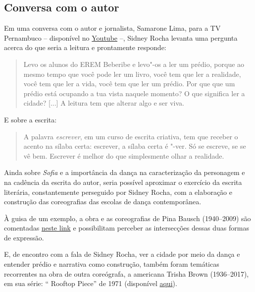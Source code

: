\documentclass[12pt]{extarticle}
\begin{document}
\subsection{Conversa com o autor}

Em uma conversa com o autor e jornalista, Samarone Lima, para a TV Pernambuco --
disponível no  
\href{https://www.youtube.com/watch?v=wLNc8aGLM5Q&ab_channel=TVPernambuco}{Youtube} --, Sidney Rocha 
levanta uma pergunta acerca do que seria a leitura e prontamente responde:

 \begin{quote}

Levo os alunos do EREM Beberibe e levo"-os a ler um prédio, porque ao mesmo tempo 
que você pode ler um livro, você tem que ler a realidade, você tem que ler a vida, 
você tem que ler um prédio. 
Por que que um prédio está ocupando a tua vista naquele momento? 
O que significa ler a cidade? 
{[}...{]}
A leitura tem que alterar algo e ser viva. 

\end{quote} 

E sobre a escrita: 

\begin{quote}

A palavra \textit{escrever}, em um curso de escrita criativa, tem que receber o acento 
na sílaba certa: escrever, a sílaba certa é "-ver.
Só se escreve, se se vê bem. 
Escrever é melhor do que simplesmente olhar a realidade. 

\end{quote} 

Ainda sobre \textit{Sofia} e a importância da dança na caracterização da personagem e na 
cadência da escrita do autor, seria possível aproximar o exercício da escrita literária, 
constantemente perseguido por Sidney Rocha, com a elaboração e construção das coreografias 
das escolas de dança contemporânea. 

À guisa de um exemplo, a obra e as coreografias de Pina Bausch (1940--2009) são comentadas 
\href{https://www.youtube.com/watch?v=hh8cUsdz1fU&ab_channel=AndresNeumann}{neste link} e 
possibilitam perceber as intersecções dessas duas formas de expressão. 

E, de encontro com a fala de Sidney Rocha, ver a cidade por meio da dança e entender prédio 
e narrativa como construção, também foram temáticas recorrentes na obra de outra coreógrafa, 
a americana Trisha Brown (1936--2017), em sua série: `` Rooftop Piece'' de 1971 (disponível 
\href{https://www.youtube.com/watch?v=s6IR8lmGTxE&ab_channel=TheGetty}{aqui}). 
\end{document}
